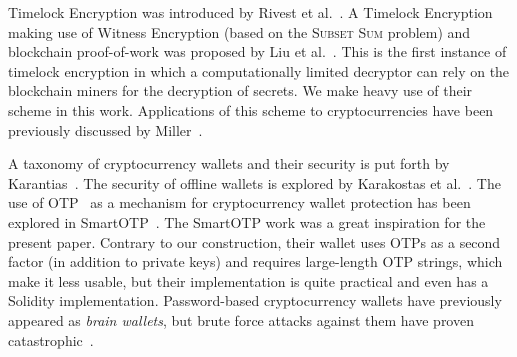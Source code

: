 Timelock Encryption was introduced by Rivest et al.~\cite{timelock}. A Timelock Encryption
making use of Witness Encryption (based on the \textsc{Subset Sum} problem) and blockchain proof-of-work was proposed by Liu et
al.~\cite{timelock-bitcoin}. This is the first instance of timelock encryption in which
a computationally limited decryptor can rely on the blockchain miners for the decryption
of secrets. We make heavy use of their scheme in this work. Applications of this scheme to cryptocurrencies
have been previously discussed by Miller~\cite{miller-timelock}.

A taxonomy of cryptocurrency wallets and their security is put forth by Karantias~\cite{wallet-taxonomy}.
The security of offline wallets is explored by Karakostas et al.~\cite{hardware-wallets}.
The use of OTP~\cite{rfc6238,rfc4226} as a mechanism for cryptocurrency wallet protection has been explored in SmartOTP~\cite{smartotp}.
The SmartOTP work was a great inspiration for the present paper. Contrary to our construction, their
wallet uses OTPs as a second factor (in addition to private keys) and requires large-length OTP strings,
which make it less usable, but their implementation is quite practical and even has a Solidity implementation.
Password-based cryptocurrency wallets have previously appeared as \emph{brain wallets},
but brute force attacks against them have proven catastrophic~\cite{brain-drain}.

